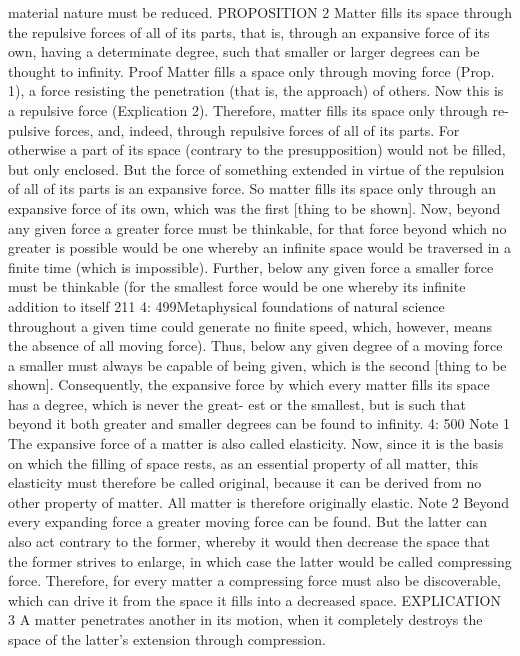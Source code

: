 material nature must be reduced.
PROPOSITION 2
Matter ﬁlls its space through the repulsive forces of all of its parts, that
is, through an expansive force of its own, having a determinate degree,
such that smaller or larger degrees can be thought to inﬁnity.
Proof
Matter ﬁlls a space only through moving force (Prop. 1), a force resisting
the penetration (that is, the approach) of others. Now this is a repulsive
force (Explication 2). Therefore, matter ﬁlls its space only through re-
pulsive forces, and, indeed, through repulsive forces of all of its parts.
For otherwise a part of its space (contrary to the presupposition) would
not be ﬁlled, but only enclosed. But the force of something extended in virtue
of the repulsion of all of its parts is an expansive force. So matter ﬁlls its space
only through an expansive force of its own, which was the ﬁrst [thing to be
shown]. Now, beyond any given force a greater force must be thinkable,
for that force beyond which no greater is possible would be one whereby
an inﬁnite space would be traversed in a ﬁnite time (which is impossible).
Further, below any given force a smaller force must be thinkable (for
the smallest force would be one whereby its inﬁnite addition to itself
211
4: 499Metaphysical foundations of natural science
throughout a given time could generate no ﬁnite speed, which, however,
means the absence of all moving force). Thus, below any given degree
of a moving force a smaller must always be capable of being given, which
is the second [thing to be shown]. Consequently, the expansive force by
which every matter ﬁlls its space has a degree, which is never the great-
est or the smallest, but is such that beyond it both greater and smaller
degrees can be found to inﬁnity.
4: 500
Note 1
The expansive force of a matter is also called elasticity. Now, since it
is the basis on which the ﬁlling of space rests, as an essential property
of all matter, this elasticity must therefore be called original, because it
can be derived from no other property of matter. All matter is therefore
originally elastic.
Note 2
Beyond every expanding force a greater moving force can be found. But
the latter can also act contrary to the former, whereby it would then
decrease the space that the former strives to enlarge, in which case the
latter would be called compressing force. Therefore, for every matter a
compressing force must also be discoverable, which can drive it from the
space it ﬁlls into a decreased space.
EXPLICATION 3
A matter penetrates another in its motion, when it completely destroys
the space of the latter’s extension through compression.
